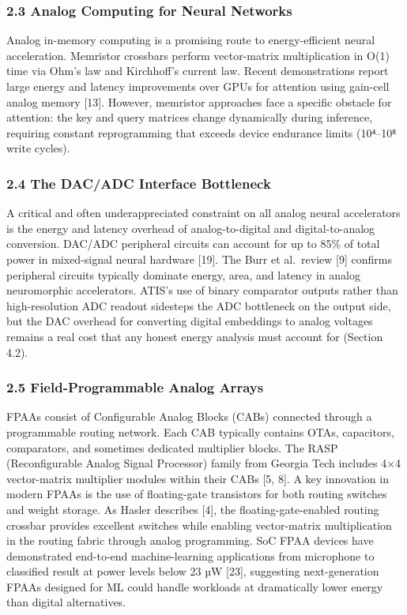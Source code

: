 \subsubsection{2.3 Analog Computing for Neural
Networks}\label{analog-computing-for-neural-networks}

Analog in-memory computing is a promising route to energy-efficient
neural acceleration. Memristor crossbars perform vector-matrix
multiplication in O(1) time via Ohm's law and Kirchhoff's current law.
Recent demonstrations report large energy and latency improvements over
GPUs for attention using gain-cell analog memory {[}13{]}. However,
memristor approaches face a specific obstacle for attention: the key and
query matrices change dynamically during inference, requiring constant
reprogramming that exceeds device endurance limits (10⁴--10⁸ write
cycles).

\subsubsection{2.4 The DAC/ADC Interface
Bottleneck}\label{the-dacadc-interface-bottleneck}

A critical and often underappreciated constraint on all analog neural
accelerators is the energy and latency overhead of analog-to-digital and
digital-to-analog conversion. DAC/ADC peripheral circuits can account
for up to 85\% of total power in mixed-signal neural hardware {[}19{]}.
The Burr et al.~review {[}9{]} confirms peripheral circuits typically
dominate energy, area, and latency in analog neuromorphic accelerators.
ATIS's use of binary comparator outputs rather than high-resolution ADC
readout sidesteps the ADC bottleneck on the output side, but the DAC
overhead for converting digital embeddings to analog voltages remains a
real cost that any honest energy analysis must account for (Section
4.2).

\subsubsection{2.5 Field-Programmable Analog
Arrays}\label{field-programmable-analog-arrays}

FPAAs consist of Configurable Analog Blocks (CABs) connected through a
programmable routing network. Each CAB typically contains OTAs,
capacitors, comparators, and sometimes dedicated multiplier blocks. The
RASP (Reconfigurable Analog Signal Processor) family from Georgia Tech
includes 4×4 vector-matrix multiplier modules within their CABs {[}5,
8{]}. A key innovation in modern FPAAs is the use of floating-gate
transistors for both routing switches and weight storage. As Hasler
describes {[}4{]}, the floating-gate-enabled routing crossbar provides
excellent switches while enabling vector-matrix multiplication in the
routing fabric through analog programming. SoC FPAA devices have
demonstrated end-to-end machine-learning applications from microphone to
classified result at power levels below 23 µW {[}23{]}, suggesting
next-generation FPAAs designed for ML could handle workloads at
dramatically lower energy than digital alternatives.


